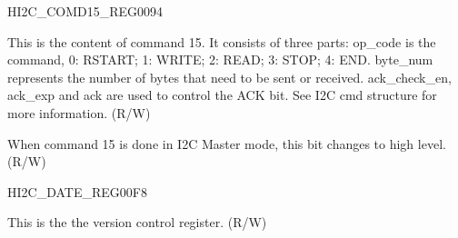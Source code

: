 \begin{register}{H}{I2C\_COMD15\_REG}{\hexprefix{}0094}\label{regdesc:I2CCOMD15REG}
%
%
%
\regnewline%
\begin{regdesc}\begin{reglist}
\label{fielddesc:I2CCOMMAND15}\item [I2C\_COMMAND15] This is the content of command 15. It consists of three parts:
op\_code is the command, 0: RSTART; 1: WRITE; 2: READ; 3: STOP; 4: END.
byte\_num represents the number of bytes that need to be sent or received.
ack\_check\_en, ack\_exp and ack are used to control the ACK bit. See I2C cmd structure for more information. (R/W)
\label{fielddesc:I2CCOMMAND15DONE}\item [I2C\_COMMAND15\_DONE] When command 15 is done in I2C Master mode, this bit changes to high level. (R/W)
\end{reglist}\end{regdesc}
\end{register}


\begin{register}{H}{I2C\_DATE\_REG}{\hexprefix{}00F8}\label{regdesc:I2CDATEREG}
%
\regnewline%
\begin{regdesc}\begin{reglist}
\label{fielddesc:I2CDATE}\item [I2C\_DATE] This is the the version control register. (R/W)
\end{reglist}\end{regdesc}
\end{register}
